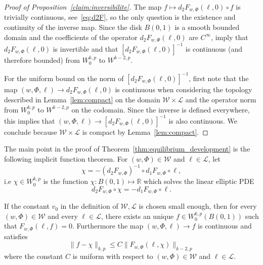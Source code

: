 \documentclass[10pt]{amsart}
\theoremstyle{definition}\newtheorem{defi}[theo]{Definition}\newtheorem{rema}[theo]{Remark}\newtheorem{exam}[theo]{Example}\newtheorem{exem}[theo]{Example}\newtheorem{nota}[theo]{Notation}
\newcommand{\R}{\mathbb{R}}
\newcommand{\clL}{\mathcal{L}}
\newcommand{\clW}{\mathcal{W}}
\newcommand{\norm}[1]{\lVert #1 \rVert}
\begin{document}
\begin{proof}[Proof of Proposition~\ref{claim:inversibilite}]
The map $f\mapsto d_2 F_{w,\Phi}(\ell,0)\circ f$ is trivially continuous, see~\eqref{eq:d2F}, so the only question is the existence and continuity of the inverse map. Since the disk $B(0,1)$ is a smooth bounded domain and the coefficients of the operator $d_2 F_{w,\Phi}(\ell,0)$ are $C^\infty$, \cite[Th.~11.3.2 and Th.~9.2.3]{krilov} imply that $d_2 F_{w,\Phi}(\ell, 0)$ is invertible and that $[d_2 F_{w,\Phi}(\ell,0)]^{-1}$ is continuous (and therefore bounded) from $W^{k,p}_0$ to $W^{k-2, p}$.

For the uniform bound on the norm of $[d_2 F_{w,\Phi}(\ell,0)]^{-1}$, first note that the map $(w, \Phi,\ell) \to d_2 F_{w,\Phi}(\ell, 0)$ is continuous when considering the topology described in Lemma~\ref{lem:compact} on the domain $\clW\times\clL$ and the operator norm from $W^{k, p}_0 $ to $W^{k-2,p}$ on the codomain. Since the inverse is defined everywhere, this implies that $(w, \Phi, \ell) \to [d_2F _{w,\Phi}(\ell, 0)]^{-1}$ is also continuous. We conclude because $\clW \times \clL $ is compact by Lemma~\ref{lem:compact}.
\end{proof}



The main point in the proof of Theorem~\ref{thm:equilibrium_development} is the following implicit function theorem. For $(w, \Phi) \in \clW$ and $\ell \in \clL$, let
\begin{equation}\label{eq:chichi}
\chi = -(d_2F_{w, \Phi})^{-1} \circ d_1 F_{w, \Phi} \circ \ell,
\end{equation}
i.e $\chi\in W^{k,p}_0$ is the function $\chi:B(0,1)\mapsto \R$ which solves the linear elliptic PDE
\begin{equation}\label{eq:chichi2}
d_2 F_{w, \Phi}\circ \chi = - d_1 F_{w, \Phi}\circ \ell.
\end{equation}
\begin{prop}\label{prop:analysefonct}
If the constant $v_0$ in the definition of $\clW,\clL$ is chosen small enough, then for every $(w, \Phi) \in \clW$ and every $\ell \in \clL$, there exists an unique $f\in W^{k,p}_0(B(0,1))$ such that $F_{w, \Phi}(\ell, f)=0$. Furthermore the map $(w, \Phi, \ell) \to f$ is continuous and satisfies
\begin{equation}\label{eq:implicit}
\norm{f -\chi}_{{k, p}} \leq C \norm{F_{w,\Phi}(\ell, \chi)}_{{k-2, p}}
\end{equation}
where the constant $C$ is uniform with respect to $(w, \Phi)\in\clW$ and $\ell\in\clL$.
\end{prop}
\end{document}

